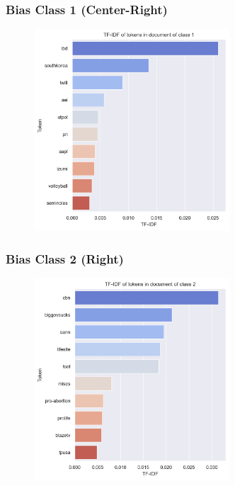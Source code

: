 \documentclass[11pt]{article}
\begin{document}
\pagebreak

\subsubsection{Bias Class 1 (Center-Right)}
\begin{center}


\TTTFIDFTable
\begin{figure}[h!]
  \includegraphics[width=0.65\textwidth]{figs/top_ten_tf_idf/tf_idf_token_1.png}
\end{figure}
\end{center}

\pagebreak

\subsubsection{Bias Class 2 (Right)}
\begin{center}


\TTTFIDFTable
\begin{figure}[h!]
  \includegraphics[width=0.65\textwidth]{figs/top_ten_tf_idf/tf_idf_token_2.png}
\end{figure}
\end{center}
\end{document}
